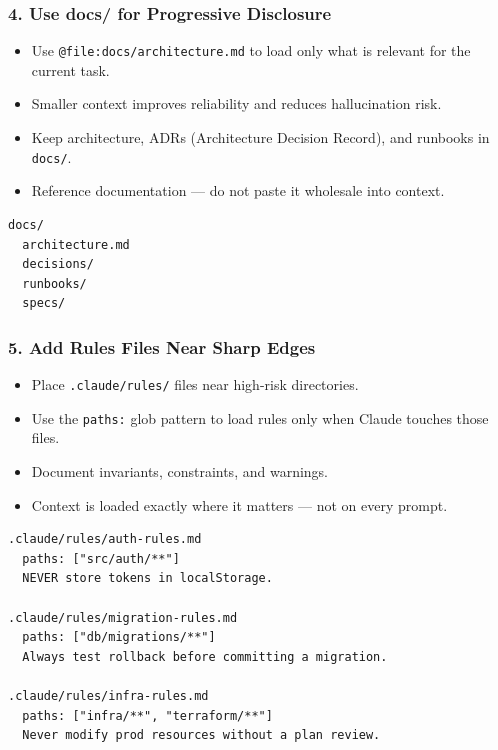 \begin{frame}[fragile]\frametitle{4. Use docs/ for Progressive Disclosure}

  \begin{itemize}
    \item Use \texttt{@file:docs/architecture.md} to load only what is relevant for the current task.
    \item Smaller context improves reliability and reduces hallucination risk.
    \item Keep architecture, ADRs (Architecture Decision Record), and runbooks in \texttt{docs/}.
    \item Reference documentation --- do not paste it wholesale into context.
  \end{itemize}

\begin{lstlisting}
docs/
  architecture.md
  decisions/
  runbooks/
  specs/
\end{lstlisting}


\end{frame}

\begin{frame}[fragile]\frametitle{5. Add Rules Files Near Sharp Edges}
  \begin{itemize}
    \item Place \texttt{.claude/rules/} files near high-risk directories.
    \item Use the \texttt{paths:} glob pattern to load rules only when Claude touches those files.
    \item Document invariants, constraints, and warnings.
    \item Context is loaded exactly where it matters --- not on every prompt.
  \end{itemize}
\begin{lstlisting}
.claude/rules/auth-rules.md
  paths: ["src/auth/**"]
  NEVER store tokens in localStorage.

.claude/rules/migration-rules.md
  paths: ["db/migrations/**"]
  Always test rollback before committing a migration.

.claude/rules/infra-rules.md
  paths: ["infra/**", "terraform/**"]
  Never modify prod resources without a plan review.
\end{lstlisting}


\end{frame}

